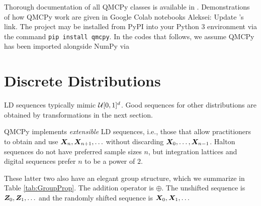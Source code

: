\documentclass[graybox,footinfo]{svmult}
\newcommand{\AGSComment}[1]{{\color{cyan} Aleksei: #1}}
\begin{document}
Thorough documentation of all QMCPy classes is available in \cite{QMCPyDocs}. Demonstrations of how QMCPy work are given in Google Colab notebooks \cite{QMCPyTutColab2020,QMCPyTutColab2020_paper} \AGSComment{Update \cite{QMCPyTutColab2020_paper}'s link}. The project may be installed from PyPI into your Python 3 environment via the command \texttt{pip install qmcpy}. In the codes that follows, we assume QMCPy has been imported alongside NumPy \cite{numpy} 
via


\section{Discrete Distributions}

LD sequences typically mimic ${\mathcal{U}}[0,1]^d$.  Good sequences for other distributions are obtained by transformations in the next section.  

QMCPy implements \emph{extensible} LD sequences, i.e., those that allow practitioners to obtain and use ${\boldsymbol{X}}_n, {\boldsymbol{X}}_{n+1}, \ldots $ without discarding ${\boldsymbol{X}}_0, \ldots, {\boldsymbol{X}}_{n-1}$.  Halton sequences do not have preferred sample sizes $n$, but integration lattices and digital sequences prefer $n$ to be a power of $2$.  

These latter two also have an elegant group structure, which we summarize in Table \ref{tab:GroupProp}.  The addition operator  is $\oplus$.  The unshifted sequence is ${\boldsymbol{Z}}_0, {\boldsymbol{Z}}_1, \ldots$ and the randomly shifted sequence is ${\boldsymbol{X}}_0, {\boldsymbol{X}}_1, \ldots$
\end{document}
